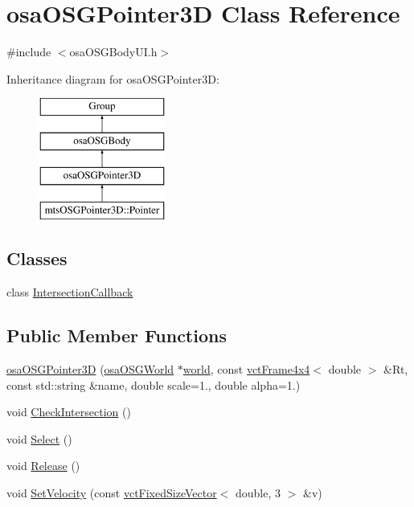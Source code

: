 \hypertarget{classosa_o_s_g_pointer3_d}{\section{osa\-O\-S\-G\-Pointer3\-D Class Reference}
\label{classosa_o_s_g_pointer3_d}
}


{\ttfamily \#include $<$osa\-O\-S\-G\-Body\-U\-I.\-h$>$}

Inheritance diagram for osa\-O\-S\-G\-Pointer3\-D\-:\begin{figure}[H]
\begin{center}
\leavevmode
\includegraphics[height=4.000000cm]{d4/dc4/classosa_o_s_g_pointer3_d}
\end{center}
\end{figure}
\subsection*{Classes}
\begin{DoxyCompactItemize}
\item 
class \hyperlink{classosa_o_s_g_pointer3_d_1_1_intersection_callback}{Intersection\-Callback}
\end{DoxyCompactItemize}
\subsection*{Public Member Functions}
\begin{DoxyCompactItemize}
\item 
\hyperlink{classosa_o_s_g_pointer3_d_ab3ac4146d29dbee143442e45d5291ebb}{osa\-O\-S\-G\-Pointer3\-D} (\hyperlink{classosa_o_s_g_world}{osa\-O\-S\-G\-World} $\ast$\hyperlink{classosa_o_s_g_pointer3_d_a6576d36096a1c3a9127fbf9dbafee677}{world}, const \hyperlink{classvct_frame4x4}{vct\-Frame4x4}$<$ double $>$ \&Rt, const std\-::string \&name, double scale=1., double alpha=1.)
\item 
void \hyperlink{classosa_o_s_g_pointer3_d_aa51e8dc14f22a449c93a78d873f6475f}{Check\-Intersection} ()
\item 
void \hyperlink{classosa_o_s_g_pointer3_d_a31f316426965bb26f8f60038ec3cec09}{Select} ()
\item 
void \hyperlink{classosa_o_s_g_pointer3_d_a5992e455b2cf10becf0c53c68d2675c6}{Release} ()
\item 
void \hyperlink{classosa_o_s_g_pointer3_d_ad4ae75b60655b5f3cfec87548a4a3648}{Set\-Velocity} (const \hyperlink{classvct_fixed_size_vector}{vct\-Fixed\-Size\-Vector}$<$ double, 3 $>$ \&v)
\end{DoxyCompactItemize}
